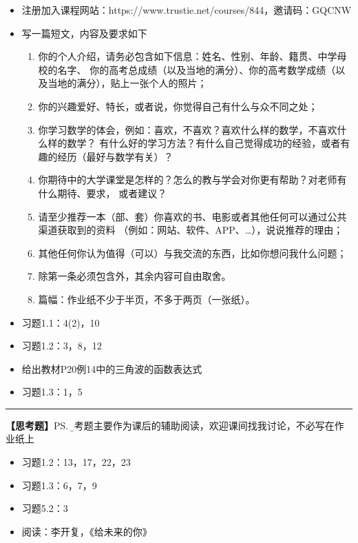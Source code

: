 \begin{itemize}
  \item 注册加入课程网站：https://www.trustie.net/courses/844，邀请码：GQCNW
  \item 写一篇短文，内容及要求如下
  \begin{enumerate}[(1)]
    \item 你的个人介绍，请务必包含如下信息：姓名、性别、年龄、籍贯、中学母校的名字、
    你的高考总成绩（以及当地的满分）、你的高考数学成绩（以及当地的满分），贴上一张个人的照片；
    \item 你的兴趣爱好、特长，或者说，你觉得自己有什么与众不同之处；
    \item 你学习数学的体会，例如：喜欢，不喜欢？喜欢什么样的数学，不喜欢什么样的数学？
    有什么好的学习方法？有什么自己觉得成功的经验，或者有趣的经历（最好与数学有关）？
    \item 你期待中的大学课堂是怎样的？怎么的教与学会对你更有帮助？对老师有什么期待、要求，
    或者建议？
    \item 请至少推荐一本（部、套）你喜欢的书、电影或者其他任何可以通过公共渠道获取到的资料
    （例如：网站、软件、APP、\ldots），说说推荐的理由；
    \item 其他任何你认为值得（可以）与我交流的东西，比如你想问我什么问题；
    \item 除第一条必须包含外，其余内容可自由取舍。
    \item 篇幅：作业纸不少于半页，不多于两页（一张纸）。
  \end{enumerate}
  \item 习题1.1：4(2)，10
%   
%   
%   
  \item 习题1.2：3，8，12
  \item 给出教材P20例14中的三角波的函数表达式
  \item 习题1.3：1，5
\end{itemize}

\bigskip

\hrule

\bigskip
\bigskip

{\bf 【思考题】}\ps{\b 思考题主要作为课后的辅助阅读，欢迎课间找我讨论，不必写在作业纸上}

\begin{itemize}
  \item 习题1.2：13，17，22，23
  \item 习题1.3：6，7，9
  \item 习题5.2：3
  \item 阅读：李开复，《给未来的你》
\end{itemize}

